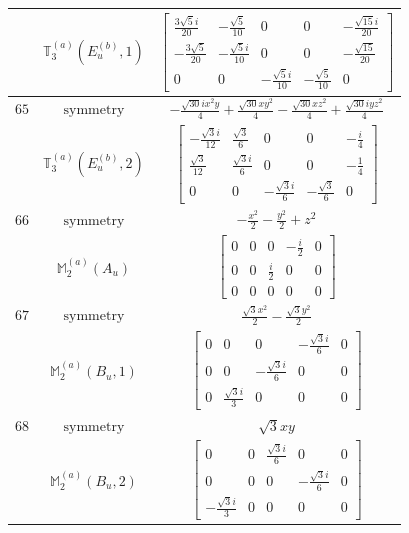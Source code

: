 \documentclass[fleqn,8pt,landscape]{jsarticle}
\begin{document}
\begin{longtable}{ccc}
$  $ & $ \mathbb{T}_{3}^{(a)}(E_{u}^{(b)},1) $ & $ \begin{bmatrix} \frac{3 \sqrt{5} i}{20} & - \frac{\sqrt{5}}{10} & 0 & 0 & - \frac{\sqrt{15} i}{20} \\ - \frac{3 \sqrt{5}}{20} & - \frac{\sqrt{5} i}{10} & 0 & 0 & - \frac{\sqrt{15}}{20} \\ 0 & 0 & - \frac{\sqrt{5} i}{10} & - \frac{\sqrt{5}}{10} & 0 \end{bmatrix} $ \\ \hline
$ 65 $ & $ \text{symmetry} $ & $ - \frac{\sqrt{30} i x^{2} y}{4} + \frac{\sqrt{30} x y^{2}}{4} - \frac{\sqrt{30} x z^{2}}{4} + \frac{\sqrt{30} i y z^{2}}{4} $ \\
$  $ & $ \mathbb{T}_{3}^{(a)}(E_{u}^{(b)},2) $ & $ \begin{bmatrix} - \frac{\sqrt{3} i}{12} & \frac{\sqrt{3}}{6} & 0 & 0 & - \frac{i}{4} \\ \frac{\sqrt{3}}{12} & \frac{\sqrt{3} i}{6} & 0 & 0 & - \frac{1}{4} \\ 0 & 0 & - \frac{\sqrt{3} i}{6} & - \frac{\sqrt{3}}{6} & 0 \end{bmatrix} $ \\ \hline
$ 66 $ & $ \text{symmetry} $ & $ - \frac{x^{2}}{2} - \frac{y^{2}}{2} + z^{2} $ \\
$  $ & $ \mathbb{M}_{2}^{(a)}(A_{u}) $ & $ \begin{bmatrix} 0 & 0 & 0 & - \frac{i}{2} & 0 \\ 0 & 0 & \frac{i}{2} & 0 & 0 \\ 0 & 0 & 0 & 0 & 0 \end{bmatrix} $ \\ \hline
$ 67 $ & $ \text{symmetry} $ & $ \frac{\sqrt{3} x^{2}}{2} - \frac{\sqrt{3} y^{2}}{2} $ \\
$  $ & $ \mathbb{M}_{2}^{(a)}(B_{u},1) $ & $ \begin{bmatrix} 0 & 0 & 0 & - \frac{\sqrt{3} i}{6} & 0 \\ 0 & 0 & - \frac{\sqrt{3} i}{6} & 0 & 0 \\ 0 & \frac{\sqrt{3} i}{3} & 0 & 0 & 0 \end{bmatrix} $ \\ \hline
$ 68 $ & $ \text{symmetry} $ & $ \sqrt{3} x y $ \\
$  $ & $ \mathbb{M}_{2}^{(a)}(B_{u},2) $ & $ \begin{bmatrix} 0 & 0 & \frac{\sqrt{3} i}{6} & 0 & 0 \\ 0 & 0 & 0 & - \frac{\sqrt{3} i}{6} & 0 \\ - \frac{\sqrt{3} i}{3} & 0 & 0 & 0 & 0 \end{bmatrix} $ \\ \hline

\end{longtable}
\end{document}
